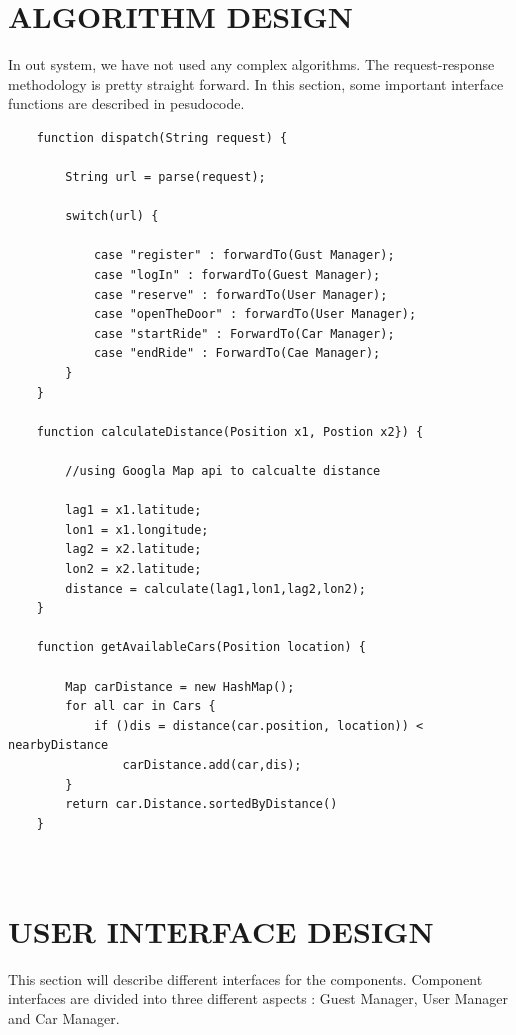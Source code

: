 \documentclass{article}
\begin{document}
	\section{ALGORITHM DESIGN}
	In out system, we have not used any complex algorithms. The request-response methodology is pretty straight forward. In this section, some important interface functions  are described in pesudocode.
	\begin{verbatim}
	function dispatch(String request) {
	
		String url = parse(request);
	
		switch(url) {
	
			case "register" : forwardTo(Gust Manager);	
			case "logIn" : forwardTo(Guest Manager);	
			case "reserve" : forwardTo(User Manager);	
			case "openTheDoor" : forwardTo(User Manager);	
			case "startRide" : ForwardTo(Car Manager);
			case "endRide" : ForwardTo(Cae Manager); 
		}
	}
	
	function calculateDistance(Position x1, Postion x2}) {
		
		//using Googla Map api to calcualte distance
		
		lag1 = x1.latitude;
		lon1 = x1.longitude;
		lag2 = x2.latitude;
		lon2 = x2.latitude;
		distance = calculate(lag1,lon1,lag2,lon2);
	}
	
	function getAvailableCars(Position location) {
		
		Map carDistance = new HashMap();
		for all car in Cars {
			if ()dis = distance(car.position, location)) < nearbyDistance 
				carDistance.add(car,dis);
		}
		return car.Distance.sortedByDistance()
	}
	
	
	\end{verbatim}
	\section{USER INTERFACE DESIGN}
	This section will describe different interfaces for the components. Component interfaces are divided into three different aspects : Guest Manager, User Manager and Car Manager.
	
	\newpage
\end{document}
